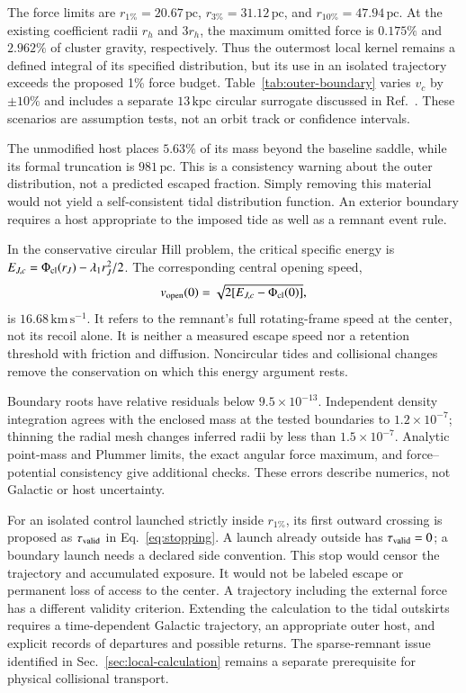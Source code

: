 \documentclass[aps,prd,reprint,amsmath,amssymb,superscriptaddress,nofootinbib,longbibliography,floatfix]{revtex4-2}
\begin{document}
The force limits are $r_{1\%}=20.67\,\mathrm{pc}$, $r_{3\%}=31.12\,\mathrm{pc}$, and $r_{10\%}=47.94\,\mathrm{pc}$. At the existing coefficient radii $r_h$ and $3r_h$, the maximum omitted force is $0.175\%$ and $2.962\%$ of cluster gravity, respectively. Thus the outermost local kernel remains a defined integral of its specified distribution, but its use in an isolated trajectory exceeds the proposed 1\% force budget. Table~\ref{tab:outer-boundary} varies $v_c$ by $\pm10\%$ and includes a separate $13\,\mathrm{kpc}$ circular surrogate discussed in Ref.~\cite{Wan2021}. These scenarios are assumption tests, not an orbit track or confidence intervals.

The unmodified host places $5.63\%$ of its mass beyond the baseline saddle, while its formal truncation is $981\,\mathrm{pc}$. This is a consistency warning about the outer distribution, not a predicted escaped fraction. Simply removing this material would not yield a self-consistent tidal distribution function. An exterior boundary requires a host appropriate to the imposed tide as well as a remnant event rule.

In the conservative circular Hill problem, the critical specific energy is $E_{J,c}=\Phi_{\rm cl}(r_J)-\lambda_1r_J^2/2$. The corresponding central opening speed,
\begin{equation}
v_{\rm open}(0)=\sqrt{2[E_{J,c}-\Phi_{\rm cl}(0)]},
\label{eq:opening-speed}
\end{equation}
is $16.68\,\mathrm{km\,s^{-1}}$. It refers to the remnant's full rotating-frame speed at the center, not its recoil alone. It is neither a measured escape speed nor a retention threshold with friction and diffusion. Noncircular tides and collisional changes remove the conservation on which this energy argument rests.

Boundary roots have relative residuals below $9.5\times10^{-13}$. Independent density integration agrees with the enclosed mass at the tested boundaries to $1.2\times10^{-7}$; thinning the radial mesh changes inferred radii by less than $1.5\times10^{-7}$. Analytic point-mass and Plummer limits, the exact angular force maximum, and force--potential consistency give additional checks. These errors describe numerics, not Galactic or host uncertainty.

For an isolated control launched strictly inside $r_{1\%}$, its first outward crossing is proposed as $\tau_{\rm valid}$ in Eq.~\eqref{eq:stopping}. A launch already outside has $\tau_{\rm valid}=0$; a boundary launch needs a declared side convention. This stop would censor the trajectory and accumulated exposure. It would not be labeled escape or permanent loss of access to the center. A trajectory including the external force has a different validity criterion. Extending the calculation to the tidal outskirts requires a time-dependent Galactic trajectory, an appropriate outer host, and explicit records of departures and possible returns. The sparse-remnant issue identified in Sec.~\ref{sec:local-calculation} remains a separate prerequisite for physical collisional transport.
\end{document}
